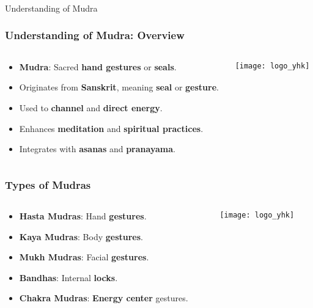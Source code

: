 \begin{frame}[fragile]\frametitle{}
\begin{center}
{\Large Understanding of Mudra}
\end{center}
\end{frame}

\begin{frame}[fragile]\frametitle{Understanding of Mudra: Overview}
\begin{columns}
    \begin{column}[T]{0.5\linewidth}
      \begin{itemize}
        \item \textbf{Mudra}: Sacred \textbf{hand gestures} or \textbf{seals}.
        \item Originates from \textbf{Sanskrit}, meaning \textbf{seal} or \textbf{gesture}.
        \item Used to \textbf{channel} and \textbf{direct energy}.
        \item Enhances \textbf{meditation} and \textbf{spiritual practices}.
        \item Integrates with \textbf{asanas} and \textbf{pranayama}.
      \end{itemize}
    \end{column}
    \begin{column}[T]{0.5\linewidth}
        \begin{center}
        \texttt{[image: logo\_yhk]}
        \end{center}	
    \end{column}
\end{columns}
\end{frame}

\begin{frame}[fragile]\frametitle{Types of Mudras}
\begin{columns}
    \begin{column}[T]{0.5\linewidth}
      \begin{itemize}
        \item \textbf{Hasta Mudras}: Hand \textbf{gestures}.
        \item \textbf{Kaya Mudras}: Body \textbf{gestures}.
        \item \textbf{Mukh Mudras}: Facial \textbf{gestures}.
        \item \textbf{Bandhas}: Internal \textbf{locks}.
        \item \textbf{Chakra Mudras}: \textbf{Energy center} gestures.
      \end{itemize}
    \end{column}
    \begin{column}[T]{0.5\linewidth}
        \begin{center}
        \texttt{[image: logo\_yhk]}
        \end{center}	
    \end{column}
\end{columns}
\end{frame}

